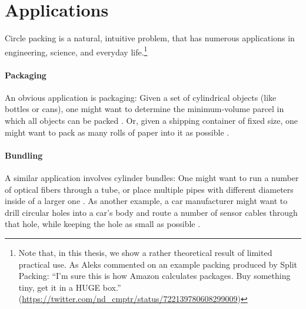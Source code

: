 \documentclass[a4paper,style=print,bibliography=totoc,nexus,lnum,extramargin]{tubsbook}
\begin{document}
%
%
%

\section{Applications}

Circle packing is a natural, intuitive problem, that has numerous applications in engineering, science, and everyday life.\footnote{Note that, in this thesis, we show a rather theoretical result of limited practical use. As Aleks commented on an example packing produced by Split Packing: “I'm sure this is how Amazon calculates packages. Buy something tiny, get it in a HUGE box.” (\url{https://twitter.com/nd_cmptr/status/722139780608299009})}

\paragraph{Packaging}

An obvious application is packaging: Given a set of cylindrical objects (like bottles or cans), one might want to determine the minimum-volume parcel in which all objects can be packed \parencite{CKP2008solving}. Or, given a shipping container of fixed size, one might want to pack as many rolls of paper into it as possible \parencite{fraser1994integrated}.

\paragraph{Bundling}

A similar application involves cylinder bundles:
One might want to run a number of optical fibers through a tube, or place multiple pipes with different diameters inside of a larger one \parencite{WHZX2002improved}. As another example, a car manufacturer might want to drill circular holes into a car's body and route a number of sensor cables through that hole, while keeping the hole as small as possible \cite{SSSKK2004disk}.
\end{document}
